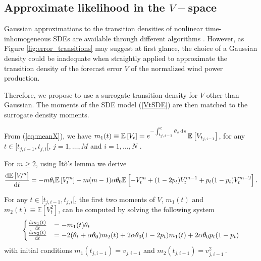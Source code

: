 \documentclass[11pt]{article}
\theoremstyle{definition}
\begin{document}
\subsection{Approximate likelihood  in the $V-$space} \label{moments_ODEs}

Gaussian approximations to the transition densities of nonlinear time-inhomogeneous SDEs are available through different algorithms \autocite[Chapter 9]{saso}. However, as Figure \ref{fig:error_transitions} may suggest at first glance, the choice of a Gaussian density could be inadequate when straightly applied to approximate the transition density of the forecast error $V$ of the normalized wind power production. 

Therefore, we propose to use a surrogate transition density for $V$ other than Gaussian. The moments of the SDE model (\ref{VtSDE}) are then matched to the surrogate density moments. 

From (\ref{eq:meanX}), we have $m_1(t) \equiv \mathbb{E} \left[V_t\right] = e^{- \int_{t_{j,i-1}}^t \theta_s \dif s} \,\mathbb{E} \left[V_{t_{j,i-1}}\right]$, for any $t\in [t_{j,i-1}, t_{j, i}[$, $j = 1, \ldots, M$ and $i = 1, \ldots, N$ .

For $m \geq 2$, using It\^o's lemma %
we derive
\begin{equation}
\frac{\dif  \mathbb{E}\left[ V^m_t\right]}{\dif t} = - m \theta_t \mathbb{E}\left[ V^m_t\right] + m (m-1) \alpha \theta_0  \mathbb{E}\left[ - V_t^m + (1 - 2 p_t) V_t^{m-1} + p_t (1 -p_t) V_t^{m-2} \right] .
\end{equation}

For any $t\in [t_{j,i-1}, t_{j, i}[$, the first two moments of $V$, $m_1(t)$ and $m_2(t) \equiv \mathbb{E}\left[V_t^2\right]$, can be computed by solving the following system
\begin{equation}
\begin{cases}
\frac{\dif  m_1 (t)}{\dif t} &=  - m_1(t)\theta_t   \\
\frac{\dif  m_2 (t)}{\dif t} &=  -2 (\theta_t +\alpha \theta_0) m_2(t) + 2 \alpha\theta_0 (1-2p_t)  m_1(t) + 2 \alpha\theta_0 p_t (1-p_t) 
\end{cases}
\label{Vtmom}
\end{equation}
with initial conditions $m_1(t_{j,i-1})= v_{j, i-1}$ and $m_2(t_{j,i-1})= v_{j, i-1}^2 \,.$
\end{document}
